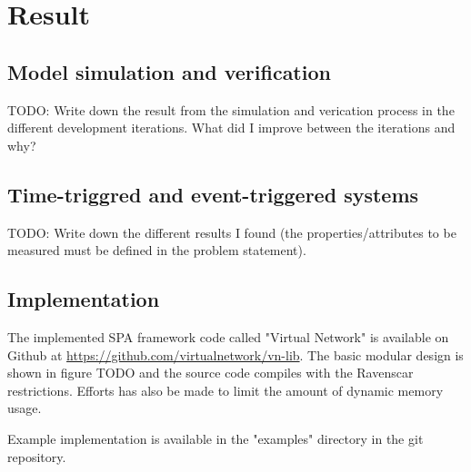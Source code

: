 \chapter{Result}\label{ch:result}
\section{Model simulation and verification}
TODO: Write down the result from the simulation and verication process in the
different development iterations. What did I improve between the iterations and
why?

\section{Time-triggred and event-triggered systems}
TODO: Write down the different results I found (the properties/attributes to be
measured must be defined in the problem statement).

\section{Implementation}
The implemented SPA framework code called "Virtual Network" is available on
Github at \url{https://github.com/virtualnetwork/vn-lib}. The basic modular
design is shown in figure TODO and the source code compiles with the Ravenscar
restrictions. Efforts has also be made to limit the amount of dynamic memory
usage.

Example implementation is available in the "examples" directory in the git
repository.
